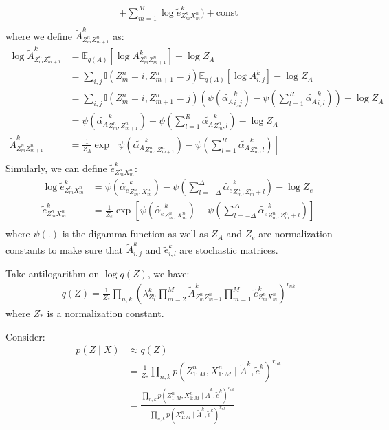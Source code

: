 \documentclass[12pt]{article}
\newenvironment{problem}[2][Problem]{\begin{trivlist}
\item[\hskip \labelsep {\bfseries #1}\hskip \labelsep {\bfseries #2.}]}{\end{trivlist}}
\begin{document}
\begin{problem}{2.8.24}
\begin{align*}
        +\sum_{m=1}^{M} \log \tilde{e}^k_{Z^n_m X^n_m})
        + \text{const} \\
\end{align*}
where we define $\tilde{A}^k_{Z^n_{m}Z^n_{m+1}}$ as:
\begin{align*}
    \log \tilde{A}^k_{Z^n_{m}Z^n_{m+1}} &= \mathbb{E}_{q(A)}[\log A^k_{Z^n_{m}Z^n_{m+1}}] - \log Z_{A}\\
    &= \sum_{i,j}\mathbb{I}(Z^n_{m} = i, Z^n_{m+1}=j)\mathbb{E}_{q(A)}[\log A^k_{i,j}] - \log Z_{A}\\
    &= \sum_{i,j}\mathbb{I}(Z^n_{m} = i, Z^n_{m+1}=j)
    (\psi(\tilde{\alpha_{A}}^k_{i,j}) -\psi(\sum_{l=1}^{R}\tilde{\alpha_{A}}^k_{i,l}))- \log Z_{A}\\
    &= \psi(\tilde{\alpha_{A}}^k_{Z^n_{m},Z^n_{m+1}}) -\psi(\sum_{l=1}^{R}\tilde{\alpha_{A}}^k_{Z^n_{m},l}) - \log Z_{A}\\
    \tilde{A}^k_{Z^n_{m}Z^n_{m+1}} &= \frac{1}{Z_{A}}
    \exp[\psi(\tilde{\alpha_{A}}^k_{Z^n_{m},Z^n_{m+1}}) -\psi(\sum_{l=1}^{R}\tilde{\alpha_{A}}^k_{Z^n_{m},l})] \\
\end{align*}
Simularly, we can define $\tilde{e}^k_{Z^n_m X^n_m}$:
\begin{align*}
    \log \tilde{e}^k_{Z^n_m X^n_m} 
    &= \psi(\tilde{\alpha_{e}}^k_{Z^n_{m},X^n_{m}}) -\psi(\sum_{l=-\Delta}^{\Delta}\tilde{\alpha_{e}}^k_{Z^n_{m},Z^n_{m}+l})
    - \log Z_{e}\\
    \tilde{e}^k_{Z^n_m X^n_m} &= \frac{1}{Z_{e}}
    \exp[\psi(\tilde{\alpha_{e}}^k_{Z^n_{m},X^n_{m}}) -\psi(\sum_{l=-\Delta}^{\Delta}\tilde{\alpha_{e}}^k_{Z^n_{m},Z^n_{m}+l})]\\
\end{align*}
where $\psi(.)$ is the digamma function as well as
$Z_{A}$ and $Z_{e}$ are normalization constants to make sure that $\tilde{A}^{k}_{i,j}$
and $\tilde{e}^{k}_{i,l}$ are stochastic matrices.

Take antilogarithm on $\log q(Z)$, we have:
\begin{align*}
    q(Z) = \frac{1}{Z_{*}}\prod_{n,k}(\lambda^k_{Z^n_{1}}
        \prod_{m=2}^{M}\tilde{A}^k_{Z^n_{m}Z^n_{m+1}}\prod_{m=1}^{M}\tilde{e}^k_{Z^n_m X^n_m})^{r_{nk}}
\end{align*}
where $Z_{*}$ is a normalization constant.

Consider:
\begin{align*}
    p(Z\mid X) &\approx q(Z) \\
    &= \frac{1}{Z_{*}}\prod_{n,k}p(Z^n_{1:M}, X^n_{1:M} \mid \tilde{A}^k, \tilde{e}^k)^{r_{nk}} \\
    &= \frac{\prod_{n,k}p(Z^n_{1:M}, X^n_{1:M} \mid \tilde{A}^k, \tilde{e}^k)^{r_{nk}}}
            {\prod_{n,k}p(X^n_{1:M} \mid \tilde{A}^k, \tilde{e}^k)^{r_{nk}}}
\end{align*}


\end{problem}
\end{document}
